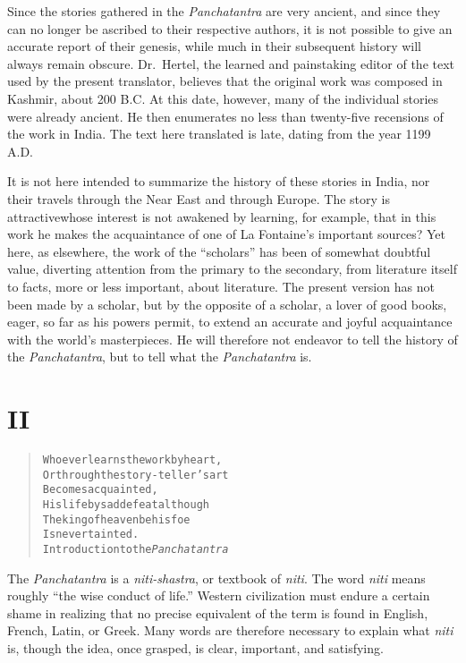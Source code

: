 \documentclass[article, twoside, 10pt]{memoir}
\renewenvironment{verbatim}{%
\begin{quote}%
\vskip -10pt%
\begin{alltt}\normalfont\small}{\end{alltt}%
\end{quote}%
\vskip -10pt
} %
\begin{document}
Since the stories gathered in the \emph{Panchatantra} are very
ancient, and since they can no longer be ascribed to their
respective authors, it is not possible to give an accurate report
of their genesis, while much in their subsequent history will
always remain obscure. Dr.~Hertel, the learned and painstaking
editor of the text used by the present translator, believes that
the original work was composed in Kashmir, about 200 B.C. At this
date, however, many of the individual stories were already ancient.
He then enumerates no less than twenty-five recensions of the work
in India. The text here translated is late, dating from the year
1199 A.D.

It is not here intended to summarize the history of these stories
in India, nor their travels through the Near East and through
Europe. The story is attractive{\textemdash}whose interest is not awakened by
learning, for example, that in this work he makes the acquaintance
of one of La Fontaine's important sources? Yet here, as elsewhere,
the work of the ``scholars'' has been of somewhat doubtful value,
diverting attention from the primary to the secondary, from
literature itself to facts, more or less important, about
literature. The present version has not been made by a scholar, but
by the opposite of a scholar, a lover of good books, eager, so far
as his powers permit, to extend an accurate and joyful acquaintance
with the world's masterpieces. He will therefore not endeavor to
tell the history of the \emph{Panchatantra}, but to tell what the
\emph{Panchatantra} is.

\section{II}

\begin{verbatim}
Whoever learns the work by heart,
Or through the story-teller's art
    Becomes acquainted,
His life by sad defeat{\textemdash}although
The king of heaven be his foe{\textemdash}
    Is never tainted.
        {\textemdash}Introduction to the \emph{Panchatantra}
\end{verbatim}
The \emph{Panchatantra} is a \emph{niti-shastra}, or textbook of
\emph{niti}. The word \emph{niti} means roughly
``the wise conduct of life.'' Western civilization must endure a
certain shame in realizing that no precise equivalent of the term
is found in English, French, Latin, or Greek. Many words are
therefore necessary to explain what \emph{niti} is, though the
idea, once grasped, is clear, important, and satisfying.
\end{document}

